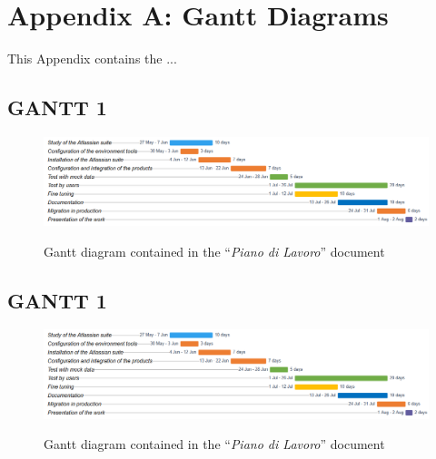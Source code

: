 \renewcommand\thechapter{A}
\chapter{Appendix A: Gantt Diagrams}
\label{AppendixA}

This Appendix contains the ...

\begin{landscape}
	\vspace*{\fill}
	\section{GANTT 1}
	\label{gantt_1}
	\begin{figure}[H]
		\centering
		\includegraphics[width=22cm]{resources/work_plan_gantt}\\
		\caption{Gantt diagram contained in the ``\textit{Piano di Lavoro}'' document}
	\end{figure}
	\vspace*{\fill}
\end{landscape}
\newpage
\begin{landscape}
	\vspace*{\fill}
	\section{GANTT 1}
	\label{gantt_2}
	\begin{figure}[H]
		\centering
		\includegraphics[width=22cm]{resources/work_plan_gantt}\\
		\caption{Gantt diagram contained in the ``\textit{Piano di Lavoro}'' document}
	\end{figure}
	\vspace*{\fill}
\end{landscape}